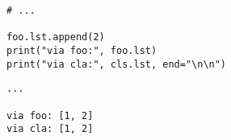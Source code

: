 
\begin{frame}[fragile]
%
\begin{tcbraster}[raster columns=2,
                  raster equal height,
                  nobeforeafter,
                  raster column skip=0.5cm]
\begin{codebox}
\begin{verbatim}
# ...

foo.lst.append(2)
print("via foo:", foo.lst)
print("via cla:", cls.lst, end="\n\n")
\end{verbatim}
\end{codebox}
%
\begin{cmdbox}
\begin{verbatim}
...

via foo: [1, 2]
via cla: [1, 2]
\end{verbatim}
\end{cmdbox}
\end{tcbraster}
%
\end{frame}


